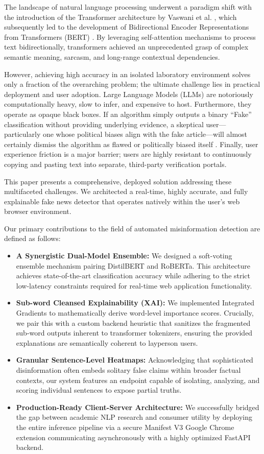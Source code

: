 \documentclass[conference]{IEEEtran}
\begin{document}
The landscape of natural language processing underwent a paradigm shift with the introduction of the Transformer architecture by Vaswani et al. \cite{b1}, which subsequently led to the development of Bidirectional Encoder Representations from Transformers (BERT) \cite{b2}. By leveraging self-attention mechanisms to process text bidirectionally, transformers achieved an unprecedented grasp of complex semantic meaning, sarcasm, and long-range contextual dependencies.

However, achieving high accuracy in an isolated laboratory environment solves only a fraction of the overarching problem; the ultimate challenge lies in practical deployment and user adoption. Large Language Models (LLMs) are notoriously computationally heavy, slow to infer, and expensive to host. Furthermore, they operate as opaque black boxes. If an algorithm simply outputs a binary ``Fake'' classification without providing underlying evidence, a skeptical user—particularly one whose political biases align with the fake article—will almost certainly dismiss the algorithm as flawed or politically biased itself \cite{b14}. Finally, user experience friction is a major barrier; users are highly resistant to continuously copying and pasting text into separate, third-party verification portals.

This paper presents a comprehensive, deployed solution addressing these multifaceted challenges. We architected a real-time, highly accurate, and fully explainable fake news detector that operates natively within the user's web browser environment. 

Our primary contributions to the field of automated misinformation detection are defined as follows:
\begin{itemize}
    \item \textbf{A Synergistic Dual-Model Ensemble:} We designed a soft-voting ensemble mechanism pairing DistilBERT and RoBERTa. This architecture achieves state-of-the-art classification accuracy while adhering to the strict low-latency constraints required for real-time web application functionality.
    \item \textbf{Sub-word Cleansed Explainability (XAI):} We implemented Integrated Gradients to mathematically derive word-level importance scores. Crucially, we pair this with a custom backend heuristic that sanitizes the fragmented sub-word outputs inherent to transformer tokenizers, ensuring the provided explanations are semantically coherent to layperson users.
    \item \textbf{Granular Sentence-Level Heatmaps:} Acknowledging that sophisticated disinformation often embeds solitary false claims within broader factual contexts, our system features an endpoint capable of isolating, analyzing, and scoring individual sentences to expose partial truths.
    \item \textbf{Production-Ready Client-Server Architecture:} We successfully bridged the gap between academic NLP research and consumer utility by deploying the entire inference pipeline via a secure Manifest V3 Google Chrome extension communicating asynchronously with a highly optimized FastAPI backend.
\end{itemize}
\end{document}
